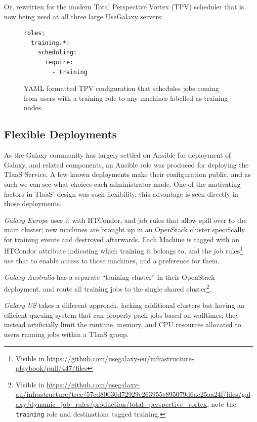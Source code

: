 Or, rewritten for the modern Total Perspective Vortex (TPV)\cite{TPV} scheduler that is now being used at all three large UseGalaxy servers:

\begin{figure}[!ht]
\centering
\begin{lstlisting}[language=bash]
roles:
  training.*:
    scheduling:
      require:
        - training
\end{lstlisting}
\caption{YAML formatted TPV configuration that schedules jobs coming from users with a training role to any machines labelled as training nodes.\label{code:tpv}}
\end{figure}

\subsection*{Flexible Deployments}
As the Galaxy community has largely settled on Ansible for deployment of Galaxy, and related components, an Ansible role was produced for deploying the TIaaS Service. A few known deployments make their configuration public, and as such we can see what choices each administrator made. One of the motivating factors in TIaaS' design was such flexibility, this advantage is seen directly in those deployments.

\emph{Galaxy Europe} uses it with HTCondor, and job rules that allow spill over to the main cluster; new machines are brought up in an OpenStack cluster specifically for training events and destroyed afterwards. Each Machine is tagged with an HTCondor attribute indicating which training it belongs to, and the job rules\footnote{Visible in \url{https://github.com/usegalaxy-eu/infrastructure-playbook/pull/447/files}} use that to enable access to those machines, and a preference for them.

\emph{Galaxy Australia} has a separate ``training cluster'' in their OpenStack deployment, and route all training jobs to the single shared cluster\footnote{Visible in \url{https://github.com/usegalaxy-au/infrastructure/tree/57cd80030d72929c263955e895079d6ac25aa24f/files/galaxy/dynamic_job_rules/production/total_perspective_vortex}, note the \texttt{training} role and destinations tagged training.}.

\emph{Galaxy US} takes a different approach, lacking additional clusters but having an efficient queuing system that can properly pack jobs based on walltimes; they instead artificially limit the runtime, memory, and CPU resources allocated to users running jobs within a TIaaS group. 

